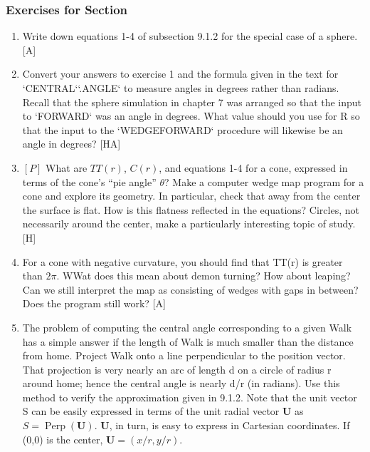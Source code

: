 \documentclass{book}
\begin{document}
\subsubsection{Exercises for Section \thesection}
\begin{enumerate}
\item Write down equations 1-4 of subsection 9.1.2 for the special case of
a sphere. [A]

\item Convert your answers to exercise 1 and the formula given in the text
for \textsc{`CENTRAL`}\textsc{`.ANGLE`} to measure angles in degrees rather than radians.
Recall that the sphere simulation in chapter 7 was arranged so that the
input to \textsc{`FORWARD`} was an angle in degrees. What value should you use
for R so that the input to the \textsc{`WEDGEFORWARD`} procedure will likewise be
an angle in degrees? [HA]

\item $[P]$ What are $TT(r)$, $C(r)$, and equations 1-4 for a cone, expressed
in terms of the cone's ``pie angle'' $\theta$? Make a computer wedge map
program for a cone and explore its geometry. In particular, check that
away from the center the surface is flat. How is this flatness reflected
in the equations? Circles, not necessarily around the center, make a
particularly interesting topic of study. [H]

\item For a cone with negative curvature, you should find that TT(r) is
greater than $2 \pi$. WWat does this mean about demon turning? How
about leaping? Can we still interpret the map as consisting of wedges
with gaps in between? Does the program still work? [A]

\item The problem of computing the central angle corresponding to a given
Walk has a simple answer if the length of Walk is much smaller than
the distance from home. Project Walk onto a line perpendicular to the
position vector. That projection is very nearly an arc of length d on a
circle of radius r around home; hence the central angle is nearly d/r (in
radians). Use this method to verify the approximation given in 9.1.2.
Note that the unit vector S can be easily expressed in terms of the
unit radial vector \textbf{U} as $S = \operatorname{Perp}(\mathbf{U})$. \textbf{U}, in turn, is easy to express in Cartesian coordinates. If (0,0) is the center, $\mathbf{U} = (x/r, y/r)$.


\end{enumerate}
\end{document}
